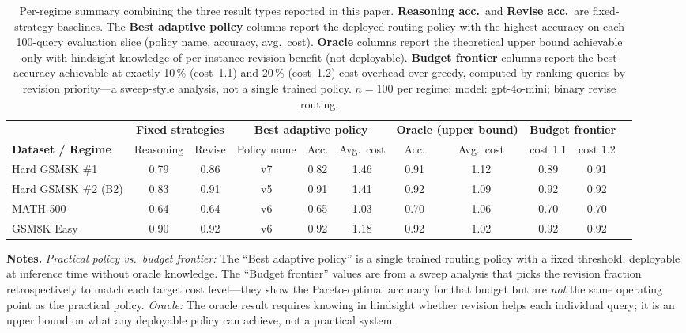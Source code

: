 %

\begin{table}[ht]
\centering
\caption{%
  Per-regime summary combining the three result types reported in this paper.
  \textbf{Reasoning acc.}~and \textbf{Revise acc.}~are fixed-strategy baselines.
  The \textbf{Best adaptive policy} columns report the deployed routing policy with the
  highest accuracy on each 100-query evaluation slice (policy name, accuracy, avg.\ cost).
  \textbf{Oracle} columns report the theoretical upper bound achievable only with
  hindsight knowledge of per-instance revision benefit (not deployable).
  \textbf{Budget frontier} columns report the best accuracy achievable at exactly
  10\,\% (cost~1.1) and 20\,\% (cost~1.2) cost overhead over greedy, computed by
  ranking queries by revision priority---a sweep-style analysis, not a single trained policy.
  $n = 100$ per regime; model: gpt-4o-mini; binary revise routing.
}
\label{tab:clarification}
\small
\setlength{\tabcolsep}{5pt}
\begin{tabular}{lcccccccccc}
\toprule
 & \multicolumn{2}{c}{\textbf{Fixed strategies}} &
   \multicolumn{3}{c}{\textbf{Best adaptive policy}} &
   \multicolumn{2}{c}{\textbf{Oracle (upper bound)}} &
   \multicolumn{2}{c}{\textbf{Budget frontier}} \\
\cmidrule(lr){2-3}\cmidrule(lr){4-6}\cmidrule(lr){7-8}\cmidrule(lr){9-10}
\textbf{Dataset / Regime} &
  Reasoning & Revise &
  Policy name & Acc. & Avg.\ cost &
  Acc. & Avg.\ cost &
  cost 1.1 & cost 1.2 \\
\midrule
Hard GSM8K \#1       & 0.79 & 0.86 & v7 & 0.82 & 1.46 & 0.91 & 1.12 & 0.89 & 0.91 \\
Hard GSM8K \#2 (B2)  & 0.83 & 0.91 & v5 & 0.91 & 1.41 & 0.92 & 1.09 & 0.92 & 0.92 \\
MATH-500             & 0.64 & 0.64 & v6 & 0.65 & 1.03 & 0.70 & 1.06 & 0.70 & 0.70 \\
GSM8K Easy           & 0.90 & 0.92 & v6 & 0.92 & 1.18 & 0.92 & 1.02 & 0.92 & 0.92 \\
\bottomrule
\end{tabular}
\bigskip

\noindent\textbf{Notes.}
\textit{Practical policy vs.\ budget frontier:}
The ``Best adaptive policy'' is a single trained routing policy with a fixed threshold,
deployable at inference time without oracle knowledge.
The ``Budget frontier'' values are from a sweep analysis that picks the revision fraction
retrospectively to match each target cost level---they show the Pareto-optimal accuracy
for that budget but are \emph{not} the same operating point as the practical policy.
\textit{Oracle:}
The oracle result requires knowing in hindsight whether revision helps each individual query;
it is an upper bound on what any deployable policy can achieve, not a practical system.
\end{table}
